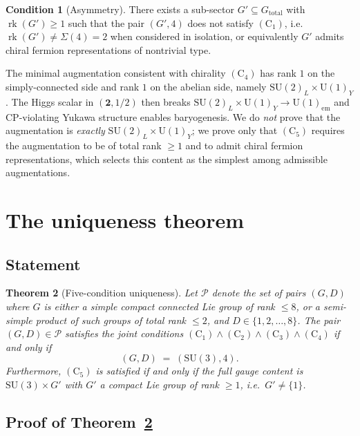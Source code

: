 \documentclass[11pt,reqno]{amsart}
\theoremstyle{plain}
\newtheorem{theorem}{Theorem}[section]
\theoremstyle{definition}
\newtheorem{condition}[theorem]{Condition}
\theoremstyle{remark}
\newcommand{\calP}{\mathcal{P}}
\newcommand{\rk}{\operatorname{rk}}
\newcommand{\SU}{\mathrm{SU}}
\newcommand{\Cone}{(\mathrm{C}_1)}
\newcommand{\Ctwo}{(\mathrm{C}_2)}
\newcommand{\Cthree}{(\mathrm{C}_3)}
\newcommand{\Cfour}{(\mathrm{C}_4)}
\newcommand{\Cfive}{(\mathrm{C}_5)}
\begin{document}
\begin{condition}[Asymmetry]\label{cond:C5}
There exists a sub-sector $G' \subseteq G_{\mathrm{total}}$ with $\rk(G') \ge 1$ such that the pair $(G', 4)$ does not satisfy $\Cone$, i.e.\ $\rk(G') \neq \Sigma(4) = 2$ when considered in isolation, or equivalently $G'$ admits chiral fermion representations of nontrivial type.
\end{condition}

The minimal augmentation consistent with chirality $\Cfour$ has rank $1$ on the simply-connected side and rank $1$ on the abelian side, namely $\SU(2)_L \times \mathrm{U}(1)_Y$. The Higgs scalar in $(\mathbf{2}, 1/2)$ then breaks $\SU(2)_L \times \mathrm{U}(1)_Y \to \mathrm{U}(1)_{\mathrm{em}}$ and CP-violating Yukawa structure enables baryogenesis. We do \emph{not} prove that the augmentation is \emph{exactly} $\SU(2)_L \times \mathrm{U}(1)_Y$; we prove only that $\Cfive$ requires the augmentation to be of total rank $\ge 1$ and to admit chiral fermion representations, which selects this content as the simplest among admissible augmentations.

\section{The uniqueness theorem}
\label{sec:uniqueness}

\subsection{Statement}\label{ssec:thm-statement}

\begin{theorem}[Five-condition uniqueness]\label{thm:main}
Let $\calP$ denote the set of pairs $(G, D)$ where $G$ is either a simple compact connected Lie group of rank $\le 8$, or a semi-simple product of such groups of total rank $\le 2$, and $D \in \{1, 2, \dots, 8\}$. The pair $(G, D) \in \calP$ satisfies the joint conditions $\Cone \wedge \Ctwo \wedge \Cthree \wedge \Cfour$ if and only if
\[
  (G, D) \;=\; (\SU(3), 4).
\]
Furthermore, $\Cfive$ is satisfied if and only if the full gauge content is $\SU(3) \times G'$ with $G'$ a compact Lie group of rank $\ge 1$, i.e.\ $G' \ne \{1\}$.
\end{theorem}

\subsection{Proof of Theorem~\ref{thm:main}}\label{ssec:thm-proof}
\end{document}
